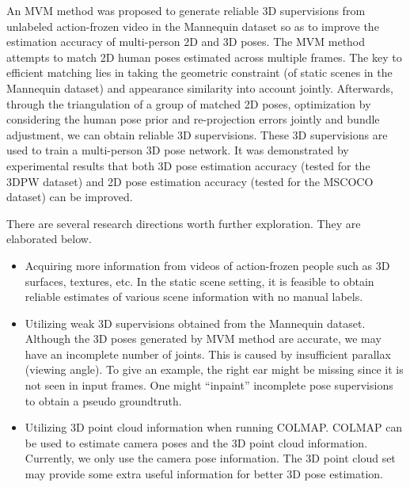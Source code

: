 \documentclass{article}
\begin{document}
An MVM method was proposed to generate reliable 3D supervisions from
unlabeled action-frozen video in the Mannequin dataset so as to improve
the estimation accuracy of multi-person 2D and 3D poses. The MVM method
attempts to match 2D human poses estimated across multiple frames. The
key to efficient matching lies in taking the geometric constraint (of
static scenes in the Mannequin dataset) and appearance similarity into
account jointly.  Afterwards, through the triangulation of a group of
matched 2D poses, optimization by considering the human pose prior and
re-projection errors jointly and bundle adjustment, we can obtain
reliable 3D supervisions.  These 3D supervisions are used to train a
multi-person 3D pose network.  It was demonstrated by experimental
results that both 3D pose estimation accuracy (tested for the 3DPW
dataset) and 2D pose estimation accuracy (tested for the MSCOCO dataset)
can be improved. 

There are several research directions worth further exploration. They are
elaborated below. 
\begin{itemize}
\item Acquiring more information from videos of action-frozen people
such as 3D surfaces, textures, etc. In the static scene setting, it is
feasible to obtain reliable estimates of various scene information with
no manual labels. 
\item Utilizing weak 3D supervisions obtained from the Mannequin
dataset.  Although the 3D poses generated by MVM method are accurate, we
may have an incomplete number of joints. This is caused by insufficient
parallax (viewing angle). To give an example, the right ear might be
missing since it is not seen in input frames. One might ``inpaint''
incomplete pose supervisions to obtain a pseudo groundtruth. 
\item Utilizing 3D point cloud information when running COLMAP.  COLMAP
can be used to estimate camera poses and the 3D point cloud information.
Currently, we only use the camera pose information.  The 3D point cloud
set may provide some extra useful information for better 3D pose
estimation. 
\end{itemize}


  
  
\end{document}
